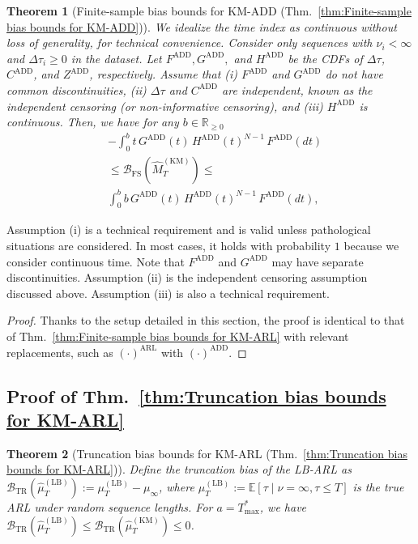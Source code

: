 \documentclass{article}
\theoremstyle{plain}
\newtheorem{theorem}{Theorem}[section]
\theoremstyle{definition}
\theoremstyle{remark}
\def\mbr{\mathbb{R}}
\def\mbe{\mathbb{E}}
\begin{document}
\begin{theorem}[Finite-sample bias bounds for KM-ADD (Thm.~\ref{thm:Finite-sample bias bounds for KM-ADD})] \label{thm:Finite-sample bias bounds for KM-ADD (Appendix)} 
    We idealize the time index as continuous without loss of generality, for technical convenience.
    Consider only sequences with $\nu_i < \infty$ and $\Delta \tau_i \geq 0$ in the dataset.
    Let $F^\mathrm{ADD}, G^\mathrm{ADD},$ and $H^\mathrm{ADD}$ be the CDFs of $\Delta \tau$, $C^\mathrm{ADD}$, and $Z^\mathrm{ADD}$, respectively. 
    Assume that (i) $F^\mathrm{ADD}$ and $G^\mathrm{ADD}$ do not have common discontinuities,  (ii) $\Delta \tau$ and $C^\mathrm{ADD}$ are independent, known as the \textit{independent censoring} (or non-informative censoring), and (iii) $H^\mathrm{ADD}$ is continuous. Then, we have for any $b \in \mbr_{\geq0}$
    \begin{align}
        &-\int_0^{b} t \,G^\mathrm{ADD}(t)\,{H^\mathrm{ADD}}(t)^{N-1}\,F^\mathrm{ADD}(dt) \\
        &\leq
        \mathcal{B}_\mathrm{FS}(\hat{M}_T^\mathrm{(KM)}) 
        \leq \\ 
        &\int_0^{b} b\,G^\mathrm{ADD}(t)\,{H^\mathrm{ADD}}(t)^{N-1}\,F^\mathrm{ADD}(dt),
    \end{align}
\end{theorem}
Assumption (i) is a technical requirement and is valid unless pathological situations are considered. 
In most cases, it holds with probability $1$ because we consider continuous time.
Note that $F^\mathrm{ADD}$ and $G^\mathrm{ADD}$ may have separate discontinuities.
Assumption (ii) is the independent censoring assumption discussed above.
Assumption (iii) is also a technical requirement.

\begin{proof}
    Thanks to the setup detailed in this section, the proof is identical to that of Thm.~\ref{thm:Finite-sample bias bounds for KM-ARL} with relevant replacements, such as $(\cdot)^\mathrm{ARL}$ with $(\cdot)^\mathrm{ADD}$.
\end{proof}


\subsection{Proof of Thm.~\ref{thm:Truncation bias bounds for KM-ARL}} \label{app:Proof of B_TR for KM-ARL}
\begin{theorem}[Truncation bias bounds for KM-ARL (Thm.~\ref{thm:Truncation bias bounds for KM-ARL})] \label{thm:Truncation bias bounds for KM-ARL (Appendix)}
    Define the truncation bias of the LB-ARL as $\mathcal{B}_\mathrm{TR}(\hat{\mu}_T^\mathrm{(LB)}) := \mu_T^\mathrm{(LB)} - \mu_\infty$, 
    where $\mu_T^\mathrm{(LB)} := \mbe[ \tau \mid \nu=\infty, \tau \leq T ]$ is the true ARL under random sequence lengths.
    For $a = T_\mathrm{max}^*$, we have
    $\mathcal{B}_\mathrm{TR}(\hat{\mu}_T^\mathrm{(LB)}) \leq \mathcal{B}_\mathrm{TR}(\hat{\mu}_T^\mathrm{(KM)}) \leq 0$.
\end{theorem}
    
\end{document}
